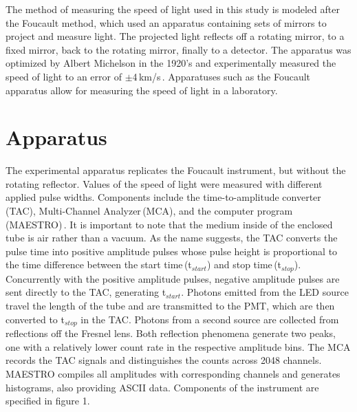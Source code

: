 \documentclass[aps,prl,twocolumn,superscriptaddress,nofootinbib]{revtex4-1}
\begin{document}
The method of measuring the speed of light used in this study is modeled after the Foucault method, which used an apparatus containing sets of mirrors to project and measure light. The projected light reflects off a rotating mirror, to a fixed mirror, back to the rotating mirror, finally to a detector. The apparatus was optimized by Albert Michelson in the 1920's and experimentally measured the speed of light to an error of $\pm$4\,km/s\,\cite{1}. Apparatuses such as the Foucault apparatus allow for measuring the speed of light in a laboratory.



\section{Apparatus}



The experimental apparatus replicates the Foucault instrument, but without the rotating reflector. Values of the speed of light were measured with different applied pulse widths. Components include the time-to-amplitude converter\,(TAC), Multi-Channel Analyzer\,(MCA), and the computer program\,(MAESTRO)\,\cite{2}. It is important to note that the medium inside of the enclosed tube is air rather than a vacuum. As the name suggests, the TAC converts the pulse time into positive amplitude pulses whose pulse height is proportional to the time difference between the start time\,(t$_{start}$) and stop time\,(t$_{stop}$). Concurrently with the positive amplitude pulses, negative amplitude pulses are sent directly to the TAC, generating t$_{start}$. Photons emitted from the LED source travel the length of the tube and are transmitted to the PMT, which are then converted to t$_{stop}$ in the TAC. Photons from a second source are collected from reflections off the Fresnel lens. Both reflection phenomena generate two peaks, one with a relatively lower count rate in the respective amplitude bins. The MCA records the TAC signals and distinguishes the counts across 2048 channels. MAESTRO compiles all amplitudes with corresponding channels and generates histograms, also providing ASCII data. Components of the instrument are specified in figure 1.
\end{document}
